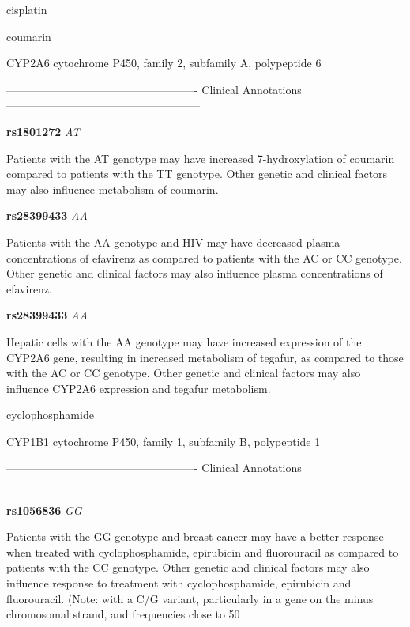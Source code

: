 \documentclass{resume} %
\begin{document}
\begin{rSection}{ cisplatin }
\end{rSection}\begin{rSection}{ coumarin }
\item[]

\begin{rSubsection}{ CYP2A6 }{ cytochrome P450, family 2, subfamily A, polypeptide 6 }{}{}
\item[]

\item[] ---------------------------------------------------- Clinical Annotations -----------------------------------------------------\newline
\item \textbf{ rs1801272 } \textit{ AT }
\item[] Patients with the AT genotype may have increased 7-hydroxylation of coumarin compared to patients with the TT genotype. Other genetic and clinical factors may also influence metabolism of coumarin.\item \textbf{ rs28399433 } \textit{ AA }
\item[] Patients with the AA genotype and HIV may have decreased plasma concentrations of efavirenz as compared to patients with the AC or CC genotype. Other genetic and clinical factors may also influence plasma concentrations of efavirenz.\item \textbf{ rs28399433 } \textit{ AA }
\item[] Hepatic cells with the AA genotype may have increased expression of the CYP2A6 gene, resulting in increased metabolism of tegafur, as compared to those with the AC or CC genotype. Other genetic and clinical factors may also influence CYP2A6 expression and tegafur metabolism.
\end{rSubsection}

\end{rSection}\begin{rSection}{ cyclophosphamide }
\item[]

\begin{rSubsection}{ CYP1B1 }{ cytochrome P450, family 1, subfamily B, polypeptide 1 }{}{}
\item[]

\item[] ---------------------------------------------------- Clinical Annotations -----------------------------------------------------\newline
\item \textbf{ rs1056836 } \textit{ GG }
\item[] Patients with the GG genotype and breast cancer may have a better response when treated with cyclophosphamide, epirubicin and fluorouracil as compared to patients with the CC genotype. Other genetic and clinical factors may also influence response to treatment with cyclophosphamide, epirubicin and fluorouracil.  (Note: with a C/G variant, particularly in a gene on the minus chromosomal strand, and frequencies close to 50%
\end{rSubsection}


\end{rSection}
\end{document}
